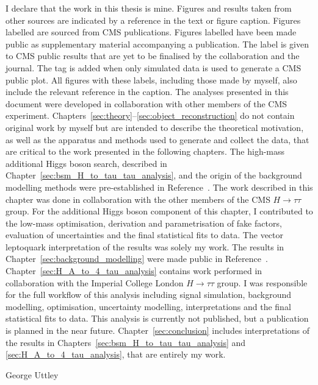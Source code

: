 \begin{titlepage}
\begin{adjustwidth}{1cm}{1cm}
I declare that the work in this thesis is mine. 
Figures and results taken from other sources are indicated by a reference in the text or figure caption. 
Figures labelled  are sourced from CMS publications. 
Figures labelled  have been made public as supplementary material accompanying a publication. 
The  label is given to CMS public results that are yet to be finalised by the collaboration and the journal.
The  tag is added when only simulated data is used to generate a CMS public plot.
All figures with these labels, including those made by myself, also include the relevant reference in the caption.
The analyses presented in this document were developed in collaboration with other members of the CMS experiment. 
Chapters~\ref{sec:theory}--\ref{sec:object_reconstruction} do not contain original work by myself but are intended to describe the theoretical motivation, as well as the apparatus and methods used to generate and collect the data, that are critical to the work presented in the following chapters. 
The high-mass additional Higgs boson search, described in Chapter~\ref{sec:bsm_H_to_tau_tau_analysis}, and the origin of the background modelling methods were pre-established in Reference~\cite{CMS_MSSM_Tau_2018}.
The work described in this chapter was done in collaboration with the other members of the CMS $H\rightarrow\tau\tau$ group.
For the additional Higgs boson component of this chapter, I contributed to the low-mass optimisation, derivation and parametrisation of fake factors, evaluation of uncertainties and the final statistical fits to data.
The vector leptoquark interpretation of the results was solely my work.
The results in Chapter~\ref{sec:background_modelling} were made public in Reference~\cite{CMS:2022rbd}.
Chapter~\ref{sec:H_A_to_4_tau_analysis} contains work performed in collaboration with the Imperial College London $H\rightarrow\tau\tau$ group.
I was responsible for the full workflow of this analysis including signal simulation, background modelling, optimisation, uncertainty modelling, interpretations and the final statistical fits to data.
This analysis is currently not published, but a publication is planned in the near future.
Chapter~\ref{sec:conclusion} includes interpretations of the results in Chapters~\ref{sec:bsm_H_to_tau_tau_analysis} and \ref{sec:H_A_to_4_tau_analysis}, that are entirely my work.

\begin{FlushRight}
George Uttley
\end{FlushRight}
\end{adjustwidth}
\vspace*{\fill}


\end{titlepage}
